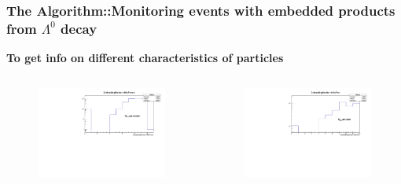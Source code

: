 \documentclass[dvipsnames] {beamer}
\begin{document}
       \begin{frame}
         \frametitle{\bf \centering \footnotesize The Algorithm::Monitoring events with embedded products from $\Lambda^{0}$ decay}
          \begin{block}{\bf \centering \tiny To get info on different characteristics of particles}
         \begin{columns}[t]
           \begin{figure}[H]
             \includegraphics[width=1.\linewidth]{EmbeddingMonitorNhitsProton.pdf}
           \end{figure}        
           \begin{figure}[H]
              \includegraphics[width=1.\linewidth]{EmbeddingMonitorNhitsPion.pdf}
           \end{figure}


\end{columns}
\end{block}
\end{frame}
\end{document}
